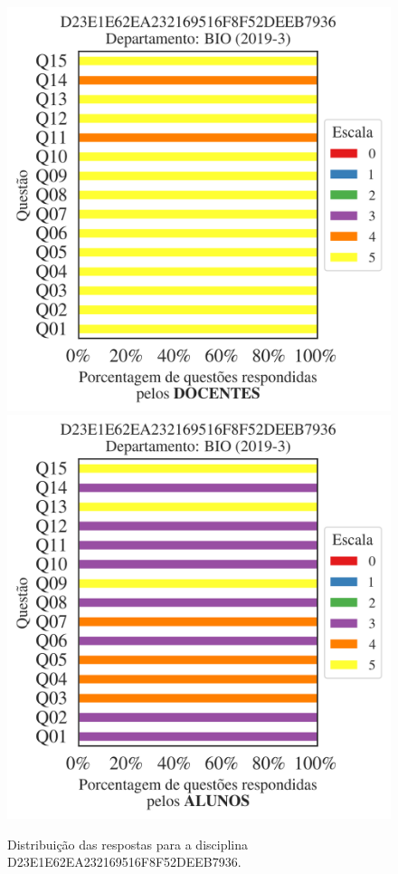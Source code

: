 \documentclass[a4paper,10pt]{article}
\begin{document}
\begin{figure}[h]
\centering
\includegraphics[width=0.485\linewidth]{analise_disciplina_departamento_BIO_D23E1E62EA232169516F8F52DEEB7936_docentes.png}
\includegraphics[width=0.485\linewidth]{analise_disciplina_departamento_BIO_D23E1E62EA232169516F8F52DEEB7936_alunos.png}
\caption{\label{fig:analise_geral_departamento}                Distribuição das respostas para a disciplina D23E1E62EA232169516F8F52DEEB7936. }
\end{figure}
\end{document}
